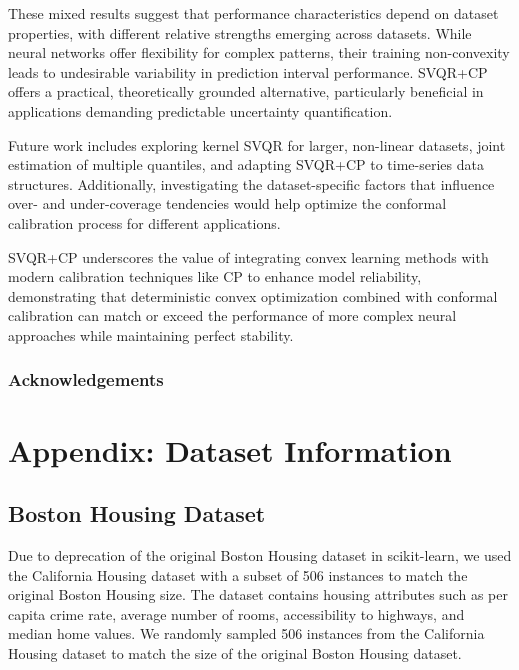 \documentclass{article}
\begin{document}
These mixed results suggest that performance characteristics depend on dataset properties, with different relative strengths emerging across datasets. While neural networks offer flexibility for complex patterns, their training non-convexity leads to undesirable variability in prediction interval performance. SVQR+CP offers a practical, theoretically grounded alternative, particularly beneficial in applications demanding predictable uncertainty quantification.

Future work includes exploring kernel SVQR for larger, non-linear datasets, joint estimation of multiple quantiles, and adapting SVQR+CP to time-series data structures. Additionally, investigating the dataset-specific factors that influence over- and under-coverage tendencies would help optimize the conformal calibration process for different applications.

SVQR+CP underscores the value of integrating convex learning methods with modern calibration techniques like CP to enhance model reliability, demonstrating that deterministic convex optimization combined with conformal calibration can match or exceed the performance of more complex neural approaches while maintaining perfect stability.

\subsubsection*{Acknowledgements}




\appendix

\section{Appendix: Dataset Information}
\label{app:datasets}

\subsection{Boston Housing Dataset}
Due to deprecation of the original Boston Housing dataset in scikit-learn, we used the California Housing dataset with a subset of 506 instances to match the original Boston Housing size. The dataset contains housing attributes such as per capita crime rate, average number of rooms, accessibility to highways, and median home values. We randomly sampled 506 instances from the California Housing dataset to match the size of the original Boston Housing dataset.
\end{document}
